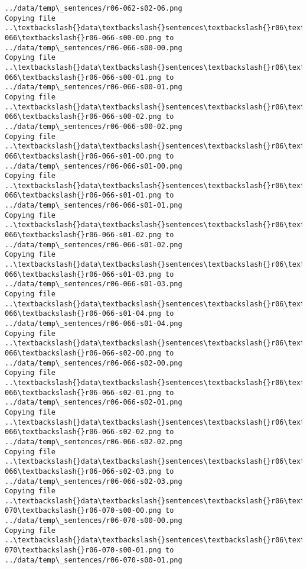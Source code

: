\documentclass[11pt]{article}
\begin{document}
\begin{Verbatim}[commandchars=\\\{\}]
../data/temp\_sentences/r06-062-s02-06.png
Copying file ..\textbackslash{}data\textbackslash{}sentences\textbackslash{}r06\textbackslash{}r06-066\textbackslash{}r06-066-s00-00.png to
../data/temp\_sentences/r06-066-s00-00.png
Copying file ..\textbackslash{}data\textbackslash{}sentences\textbackslash{}r06\textbackslash{}r06-066\textbackslash{}r06-066-s00-01.png to
../data/temp\_sentences/r06-066-s00-01.png
Copying file ..\textbackslash{}data\textbackslash{}sentences\textbackslash{}r06\textbackslash{}r06-066\textbackslash{}r06-066-s00-02.png to
../data/temp\_sentences/r06-066-s00-02.png
Copying file ..\textbackslash{}data\textbackslash{}sentences\textbackslash{}r06\textbackslash{}r06-066\textbackslash{}r06-066-s01-00.png to
../data/temp\_sentences/r06-066-s01-00.png
Copying file ..\textbackslash{}data\textbackslash{}sentences\textbackslash{}r06\textbackslash{}r06-066\textbackslash{}r06-066-s01-01.png to
../data/temp\_sentences/r06-066-s01-01.png
Copying file ..\textbackslash{}data\textbackslash{}sentences\textbackslash{}r06\textbackslash{}r06-066\textbackslash{}r06-066-s01-02.png to
../data/temp\_sentences/r06-066-s01-02.png
Copying file ..\textbackslash{}data\textbackslash{}sentences\textbackslash{}r06\textbackslash{}r06-066\textbackslash{}r06-066-s01-03.png to
../data/temp\_sentences/r06-066-s01-03.png
Copying file ..\textbackslash{}data\textbackslash{}sentences\textbackslash{}r06\textbackslash{}r06-066\textbackslash{}r06-066-s01-04.png to
../data/temp\_sentences/r06-066-s01-04.png
Copying file ..\textbackslash{}data\textbackslash{}sentences\textbackslash{}r06\textbackslash{}r06-066\textbackslash{}r06-066-s02-00.png to
../data/temp\_sentences/r06-066-s02-00.png
Copying file ..\textbackslash{}data\textbackslash{}sentences\textbackslash{}r06\textbackslash{}r06-066\textbackslash{}r06-066-s02-01.png to
../data/temp\_sentences/r06-066-s02-01.png
Copying file ..\textbackslash{}data\textbackslash{}sentences\textbackslash{}r06\textbackslash{}r06-066\textbackslash{}r06-066-s02-02.png to
../data/temp\_sentences/r06-066-s02-02.png
Copying file ..\textbackslash{}data\textbackslash{}sentences\textbackslash{}r06\textbackslash{}r06-066\textbackslash{}r06-066-s02-03.png to
../data/temp\_sentences/r06-066-s02-03.png
Copying file ..\textbackslash{}data\textbackslash{}sentences\textbackslash{}r06\textbackslash{}r06-070\textbackslash{}r06-070-s00-00.png to
../data/temp\_sentences/r06-070-s00-00.png
Copying file ..\textbackslash{}data\textbackslash{}sentences\textbackslash{}r06\textbackslash{}r06-070\textbackslash{}r06-070-s00-01.png to
../data/temp\_sentences/r06-070-s00-01.png

\end{Verbatim}
\end{document}
